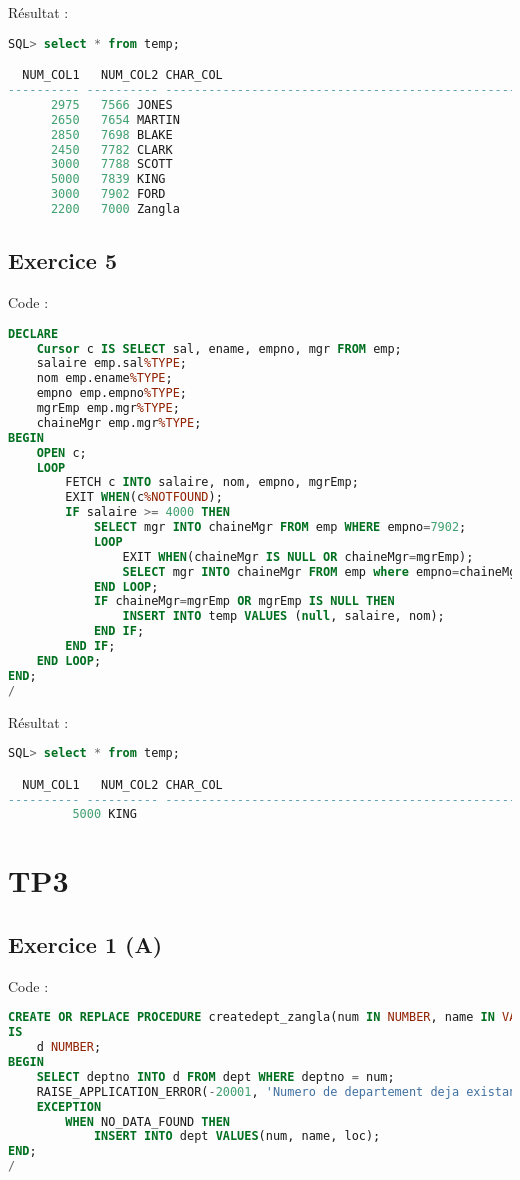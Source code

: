 \documentclass{article}
\begin{document}
Résultat :
\begin{lstlisting}[language=SQL,
    morekeywords={DECLARE, LOOP, TYPE, FOR, IF, IS, OPEN, FETCH, DBMS_OUTPUT, PUT_LINE}]
SQL> select * from temp;

  NUM_COL1   NUM_COL2 CHAR_COL
---------- ---------- -------------------------------------------------------
      2975	 7566 JONES
      2650	 7654 MARTIN
      2850	 7698 BLAKE
      2450	 7782 CLARK
      3000	 7788 SCOTT
      5000	 7839 KING
      3000	 7902 FORD
      2200	 7000 Zangla
\end{lstlisting}

\subsection{Exercice 5}
Code :
\begin{lstlisting}[language=SQL,
    deletekeywords={char},
    morekeywords={DECLARE, LOOP, TYPE, FOR, IF, IS, OPEN, FETCH, DBMS_OUTPUT, PUT_LINE}]
DECLARE
	Cursor c IS SELECT sal, ename, empno, mgr FROM emp;
	salaire emp.sal%TYPE;
	nom emp.ename%TYPE;
	empno emp.empno%TYPE;
	mgrEmp emp.mgr%TYPE;
	chaineMgr emp.mgr%TYPE;
BEGIN
	OPEN c;
	LOOP
		FETCH c INTO salaire, nom, empno, mgrEmp;
		EXIT WHEN(c%NOTFOUND);
		IF salaire >= 4000 THEN
			SELECT mgr INTO chaineMgr FROM emp WHERE empno=7902;
			LOOP
				EXIT WHEN(chaineMgr IS NULL OR chaineMgr=mgrEmp);
				SELECT mgr INTO chaineMgr FROM emp where empno=chaineMgr;
			END LOOP;
			IF chaineMgr=mgrEmp OR mgrEmp IS NULL THEN
				INSERT INTO temp VALUES (null, salaire, nom);
			END IF;
		END IF;
	END LOOP;
END;
/
\end{lstlisting}

Résultat :
\begin{lstlisting}[language=SQL,
    morekeywords={DECLARE, LOOP, TYPE, FOR, IF, IS, OPEN, FETCH, DBMS_OUTPUT, PUT_LINE}]
SQL> select * from temp;

  NUM_COL1   NUM_COL2 CHAR_COL
---------- ---------- -------------------------------------------------------
		 5000 KING
\end{lstlisting}

\newpage
\section{TP3}
\subsection{Exercice 1 (A)}
Code :
\begin{lstlisting}[language=SQL,
    deletekeywords={char},
    morekeywords={DECLARE, LOOP, TYPE, FOR, IF, IS, OPEN, FETCH, DBMS_OUTPUT, PUT_LINE}]
CREATE OR REPLACE PROCEDURE createdept_zangla(num IN NUMBER, name IN VARCHAR2, loc IN VARCHAR2)
IS
    d NUMBER;
BEGIN
    SELECT deptno INTO d FROM dept WHERE deptno = num;
    RAISE_APPLICATION_ERROR(-20001, 'Numero de departement deja existant');
    EXCEPTION 
        WHEN NO_DATA_FOUND THEN
            INSERT INTO dept VALUES(num, name, loc);
END;
/
\end{lstlisting}
\end{document}
